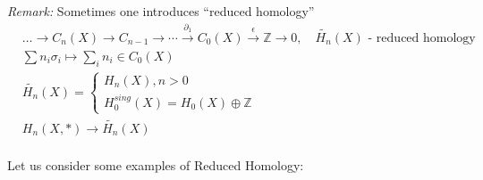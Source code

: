 \documentclass[11pt,a4paper]{report}
\begin{document}
                \emph{Remark:} Sometimes one introduces ``reduced homology''
                \begin{align*}
                  &\dots \rightarrow C_n(X) \rightarrow C_{n-1} \rightarrow \cdots \xrightarrow{\partial_1} C_0(X) \xrightarrow{\epsilon} \mathbb{Z} \rightarrow 0, \quad \tilde{H_n}(X) \textrm{ - reduced homology}\\
                  & \sum n_i\sigma_ i \mapsto \sum_in_i \in C_0(X)\\
                  &\tilde{H_n}(X) = \left\{\begin{array}{l}H_n(X), n > 0\\H_0^{sing}(X) = H_0(X)\oplus\mathbb{Z}\end{array} \right.\\
                  & H_n(X,\ast) \rightarrow \tilde{H_n}(X)\\
                \end{align*}

              Let us consider some examples of Reduced Homology: \\
\end{document}
